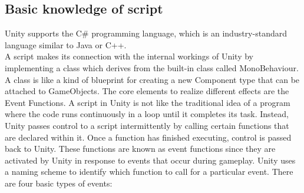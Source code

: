 \subsection{Basic knowledge of script}
Unity supports the C\# programming language, which is an industry-standard language similar to Java or C++.\\
A script makes its connection with the internal workings of Unity by implementing a class which derives from the built-in class called MonoBehaviour. A class is like a kind of blueprint for creating a new Component type that can be attached to GameObjects. The core elements to realize different effects are the Event Functions. A script in Unity is not like the traditional idea of a program where the code runs continuously in a loop until it completes its task. Instead, Unity passes control to a script intermittently by calling certain functions that are declared within it. Once a function has finished executing, control is passed back to Unity. These functions are known as event functions since they are activated by Unity in response to events that occur during gameplay. Unity uses a naming scheme to identify which function to call for a particular event. There are four basic types of events:
